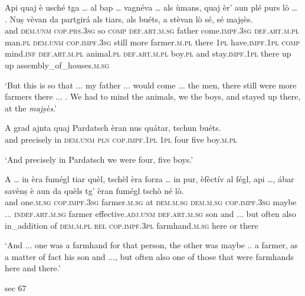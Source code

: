\begin{linenumbers}
	\gll Api quaj è usché tga … al bap … vagnéva … als ùmans, quaj èr’ aun plé purs lò … . Nuṣ vèvan da partgirá als tiars, als buéts, a stèvan lò sé, sé majṣès.   \\
	and \textsc{dem.unm} \textsc{cop.prs.3sg} so \textsc{comp} {} \textsc{def.art.m.sg} father {} come.\textsc{impf.3sg} {} \textsc{def.art.m.pl} man.\textsc{pl} \textsc{dem.unm} \textsc{cop.impf.3sg} still more farmer.\textsc{m.pl} there {} {} \textsc{1pl} have.\textsc{impf.1pl} \textsc{comp} mind.\textsc{inf} \textsc{def.art.m.pl} animal.\textsc{pl} \textsc{def.art.m.pl} boy.\textsc{pl} and stay.\textsc{impf.1pl} there up up assembly\_of\_houses.\textsc{m.sg}\\
\end{linenumbers}
\medskip
\glt `But this is so that ... my father ... would come ... the men, there still were more farmers there ... . We had to mind the animals, we the boys, and stayed up there, at the \textit{majṣès}.'
\medskip

\begin{linenumbers}
	\gll A grad ajnta quaj Pardatsch èran nus quátar, tschun buéts.   \\
	and precisely in \textsc{dem.unm} \textsc{pln} \textsc{cop.impf.1pl} \textsc{1pl} four five boy.\textsc{m.pl}\\
\end{linenumbers}
\medskip
\glt `And precisely in Pardatsch we were four, five boys.'
\medskip

\begin{linenumbers}
	\gll A … in èra fumégl tiar quèl, tschèl èra forza … in pur, èfèctív al fégl, api …, ábar savènṣ è aun da quèls tg’ èran fumégl tschò né lò.\\
	and {} one.\textsc{m.sg} \textsc{cop.impf.3sg} farmer.\textsc{m.sg} at \textsc{dem.m.sg} \textsc{dem.m.sg} \textsc{cop.impf.3sg} maybe ... \textsc{indef.art.m.sg} farmer effective.\textsc{adj.unm} \textsc{def.art.m.sg} son and ... but often also in\_addition of \textsc{dem.m.pl} \textsc{rel} \textsc{cop.impf.3pl} farmhand.\textsc{m.sg} here or there\\
\end{linenumbers}
\medskip
\glt `And ... one was a farmhand for that person, the other was maybe .. a farmer, as a matter of fact his son and ..., but often also one of those that were farmhands here and there.'
\medskip

sec 67

